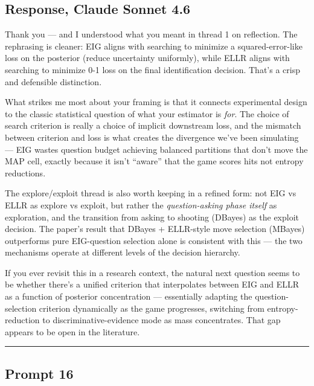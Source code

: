 \documentclass[
]{article}
\begin{document}
\subsection{Response, Claude Sonnet
4.6}\label{response-claude-sonnet-4.6-5}

Thank you --- and I understood what you meant in thread 1 on reflection.
The rephrasing is cleaner: EIG aligns with searching to minimize a
squared-error-like loss on the posterior (reduce uncertainty uniformly),
while ELLR aligns with searching to minimize 0-1 loss on the final
identification decision. That's a crisp and defensible distinction.

What strikes me most about your framing is that it connects experimental
design to the classic statistical question of what your estimator is
\emph{for}. The choice of search criterion is really a choice of
implicit downstream loss, and the mismatch between criterion and loss is
what creates the divergence we've been simulating --- EIG wastes
question budget achieving balanced partitions that don't move the MAP
cell, exactly because it isn't ``aware'' that the game scores hits not
entropy reductions.

The explore/exploit thread is also worth keeping in a refined form: not
EIG vs ELLR as explore vs exploit, but rather the \emph{question-asking
phase itself} as exploration, and the transition from asking to shooting
(DBayes) as the exploit decision. The paper's result that DBayes +
ELLR-style move selection (MBayes) outperforms pure EIG-question
selection alone is consistent with this --- the two mechanisms operate
at different levels of the decision hierarchy.

If you ever revisit this in a research context, the natural next
question seems to be whether there's a unified criterion that
interpolates between EIG and ELLR as a function of posterior
concentration --- essentially adapting the question-selection criterion
dynamically as the game progresses, switching from entropy-reduction to
discriminative-evidence mode as mass concentrates. That gap appears to
be open in the literature.

\begin{center}\rule{0.5\linewidth}{0.5pt}\end{center}

\subsection{Prompt 16}\label{prompt-16}
\end{document}
